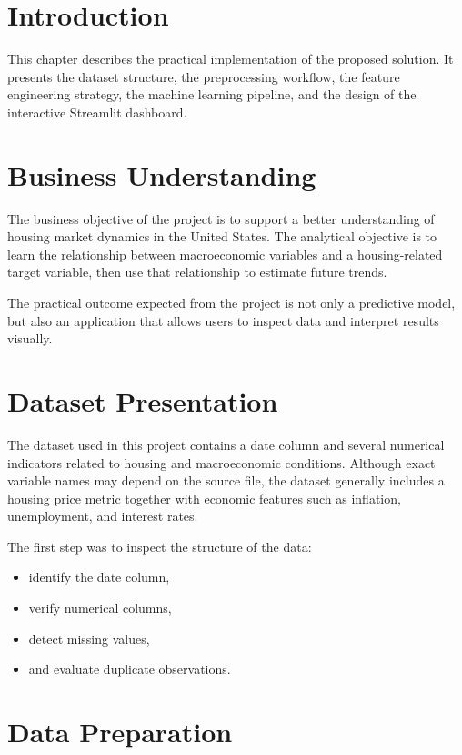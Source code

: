 
\section{Introduction}

This chapter describes the practical implementation of the proposed solution.
It presents the dataset structure, the preprocessing workflow, the feature engineering strategy, the machine learning pipeline, and the design of the interactive Streamlit dashboard.

\section{Business Understanding}

The business objective of the project is to support a better understanding of housing market dynamics in the United States.
The analytical objective is to learn the relationship between macroeconomic variables and a housing-related target variable, then use that relationship to estimate future trends.

The practical outcome expected from the project is not only a predictive model, but also an application that allows users to inspect data and interpret results visually.

\section{Dataset Presentation}

The dataset used in this project contains a date column and several numerical indicators related to housing and macroeconomic conditions.
Although exact variable names may depend on the source file, the dataset generally includes a housing price metric together with economic features such as inflation, unemployment, and interest rates.

The first step was to inspect the structure of the data:
\begin{itemize}
\item identify the date column,
\item verify numerical columns,
\item detect missing values,
\item and evaluate duplicate observations.
\end{itemize}

\section{Data Preparation}

